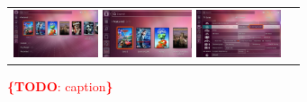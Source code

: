\documentclass{acm_proc_article-sp}
\newcommand{\todo}[1]{\noindent\textcolor{red}{{\bf \{TODO}: #1{\bf \}}}}
\newcommand{\thumbheight}{14mm}
\newcommand{\newstrip}{\newline\vspace{-1em}\newline}
\newenvironment{thumbsequence}{}{\makebox[4mm]{}}
\begin{document}
\begin{figure}
\begin{tabular}{p{}p{}}
\begin{thumbsequence}
		\newstrip
		\includegraphics[height=\thumbheight]{resources/ubuntu/looseduplicate3.jpg}
		\includegraphics[height=\thumbheight]{resources/ubuntu/looseduplicate4.jpg}
		\newstrip
		\includegraphics[height=\thumbheight]{resources/ubuntu/looseduplicate5.png}
	\end{thumbsequence}
\end{tabular}
\caption{\todo{caption}}
\label{fig:sequences}
\end{figure}

\end{document}
